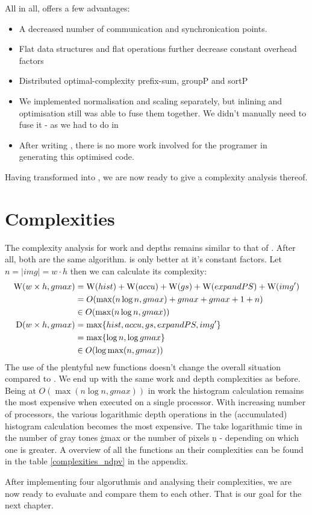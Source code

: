   All in all, \ndpv offers a few advantages:
  \begin{itemize}
    \item A decreased number of communication and synchronication points.
    \item Flat data structures and flat operations further decrease constant overhead factors 
    \item Distributed optimal-complexity prefix-sum, groupP and sortP
    \item We implemented normalisation and scaling separately, but inlining
            and optimisation still was able to fuse them together. We didn't
            manually need to fuse it - as we had to do in \man
    \item After writing \ndpn, there is no more work involved for the programer in generating this optimised code.
  \end{itemize}
  Having transformed \ndpn into \ndpv, we are now ready to give a complexity analysis thereof.
  
\section{Complexities}
  The complexity analysis for work and depths remains similar to that of \ndpn.
  After all, both are the same algorithm. \ndpv is only better at it's constant factors.
  Let $n = |img| = w\cdot h$ then we can calculate its complexity:
  \begin{equation}
  \begin{split}
  \textrm{W}(w \times h,gmax)
        & = \textrm{W}(hist) + \textrm{W}(accu) + \textrm{W}(gs) + \textrm{W}(expandPS) + \textrm{W}(img') \\
        & = O( \max(n \log n, gmax) + gmax + gmax + 1 + n) \\
        & \in O(\max(n \log n, gmax)) \\
  \textrm{D}(w \times h,gmax)
      & = \max \{ hist, accu, gs, expandPS, img'\} \\
      & = \max \{\log n, \log gmax \} \\
      & \in O(\log \max(n,gmax)) \\
  \end{split}
  \end{equation}
  The use of the plentyful new functions doesn't change the overall situation compared to \ndpn.
  We end up with the same work and depth complexities as before. Being at $O(\max(n \log n,gmax))$ in work
  the histogram calculation remains the most expensive when executed on a single processor.
  With increasing number of processors, the various logarithmic depth
  operations in the (accumulated) histogram calculation becomes the most expensive.
  The take logarithmic time in the number of gray tones \c{gmax} or the number
  of pixels \c{n} - depending on which one is greater.
  A overview of all the functions an their complexities can be found in the table \ref{complexities_ndpv} in the appendix.
  
  After implementing four algoruthmis and analysing their complexities, we are now ready
  to evaluate and compare them to each other. That is our goal for the next chapter.
  
  
  
  
